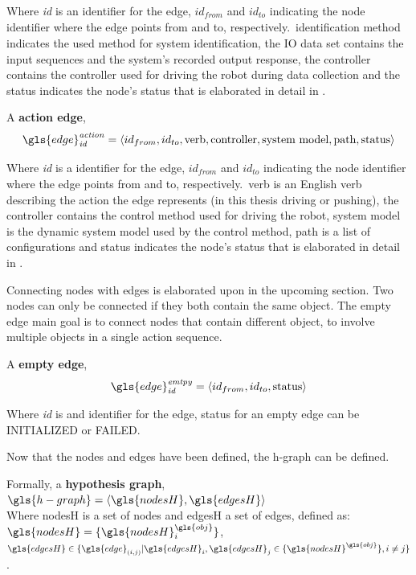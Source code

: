 Where \textit{id} is an identifier for the edge, $\mathit{id_{from}}$ and $\mathit{id_{to}}$ indicating the node identifier where the edge points from and to, respectively.~identification method indicates the used method for system identification, the \textrm{\ac{IO} data set} contains the input sequences and the system's recorded output response, the controller contains the controller used for driving the robot during data collection and the status indicates the node's status that is elaborated in detail in .\bs

A \textbf{action edge}, \[\gls{edge}^\mathit{action}_\mathit{id} = \left\langle id_{from}, id_{to}, \textrm{verb}, \textrm{controller},\textrm{system model}, \textrm{path}, \textrm{status} \right\rangle\]\bs

Where \textit{id} is a identifier for the edge, $\mathit{id_{from}}$ and $\mathit{id_{to}}$ indicating the node identifier where the edge points from and to, respectively.~verb is an English verb describing the action the edge represents (in this thesis driving or pushing), the controller contains the control method used for driving the robot, system model is the dynamic system model used by the control method, path is a list of configurations and status indicates the node's status that is elaborated in detail in .\bs

Connecting nodes with edges is elaborated upon in the upcoming section. Two nodes can only be connected if they both contain the same object. The empty edge main goal is to connect nodes that contain different object, to involve multiple objects in a single action sequence.\bs

A \textbf{empty edge}, \[\gls{edge}^\mathit{emtpy}_\mathit{id} = \left\langle id_{from}, id_{to}, \textrm{status} \right\rangle\]\bs

Where \textit{id} is and identifier for the edge, status for an empty edge can be INITIALIZED or FAILED.\bs

\noindent Now that the nodes and edges have been defined, the \ac{h-graph} can be defined.\bs

Formally, a \textbf{hypothesis graph}, $\gls{h-graph} = \left\langle \gls{nodesH}, \gls{edgesH} \right\rangle $
\\ Where \gls{nodesH} is a set of nodes and \gls{edgesH} a set of edges, defined as:\\ $\gls{nodesH} = \{\gls{nodesH}^{\gls{obj}}_{i}\}$, \quad $\gls{edgesH} \in \{\gls{edge}_{(i,j)}| \gls{edgesH}_i, \gls{edgesH}_j \in \{\gls{nodesH}^{\gls{obj}} \}, i \neq j\}$.\bs

